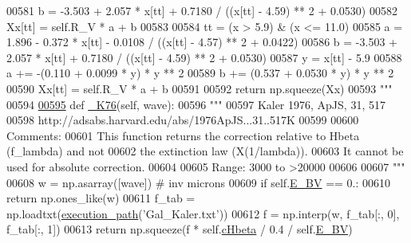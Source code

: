 \begin{DoxyCode}
00581 \textcolor{stringliteral}{        b = -3.503 + 2.057 * x[tt] + 0.7180 / ((x[tt] - 4.59) ** 2 + 0.0530)}
00582 \textcolor{stringliteral}{        Xx[tt] = self.R\_V * a + b}
00583 \textcolor{stringliteral}{}
00584 \textcolor{stringliteral}{        tt = (x > 5.9) & (x <= 11.0)}
00585 \textcolor{stringliteral}{        a = 1.896 - 0.372 * x[tt] - 0.0108 / ((x[tt] - 4.57) ** 2 + 0.0422)}
00586 \textcolor{stringliteral}{        b = -3.503 + 2.057 * x[tt] + 0.7180 / ((x[tt] - 4.59) ** 2 + 0.0530)}
00587 \textcolor{stringliteral}{        y = x[tt] - 5.9}
00588 \textcolor{stringliteral}{        a += -(0.110 + 0.0099 * y) * y ** 2}
00589 \textcolor{stringliteral}{        b += (0.537 + 0.0530 * y) * y ** 2}
00590 \textcolor{stringliteral}{        Xx[tt] = self.R\_V * a + b}
00591 \textcolor{stringliteral}{}
00592 \textcolor{stringliteral}{        return np.squeeze(Xx)}
00593 \textcolor{stringliteral}{        """}
00594 
\hypertarget{red__corr_8py_source_l00595}{}\hyperlink{classpyneb_1_1extinction_1_1red__corr_1_1_red_corr_ac1de28238af5c2fc9924c8cda6386b2a}{00595}     \textcolor{keyword}{def }\hyperlink{classpyneb_1_1extinction_1_1red__corr_1_1_red_corr_ac1de28238af5c2fc9924c8cda6386b2a}{\_K76}(self, wave):
00596         \textcolor{stringliteral}{"""}
00597 \textcolor{stringliteral}{        Kaler 1976, ApJS, 31, 517}
00598 \textcolor{stringliteral}{        http://adsabs.harvard.edu/abs/1976ApJS...31..517K}
00599 \textcolor{stringliteral}{        }
00600 \textcolor{stringliteral}{        Comments:}
00601 \textcolor{stringliteral}{        This function returns the correction relative to Hbeta (f\_lambda) and not}
00602 \textcolor{stringliteral}{        the extinction law (X(1/lambda)).}
00603 \textcolor{stringliteral}{        It cannot be used for absolute correction.}
00604 \textcolor{stringliteral}{        }
00605 \textcolor{stringliteral}{        Range: 3000 to >20000}
00606 \textcolor{stringliteral}{        }
00607 \textcolor{stringliteral}{        """}
00608         w = np.asarray([wave]) \textcolor{comment}{# inv microns}
00609         \textcolor{keywordflow}{if} self.\hyperlink{classpyneb_1_1extinction_1_1red__corr_1_1_red_corr_a0bc581bcaa8eeeb67b83ffdec58bf164}{E\_BV} == 0.:
00610             \textcolor{keywordflow}{return} np.ones\_like(w)
00611         f\_tab = np.loadtxt(\hyperlink{namespacepyneb_1_1utils_1_1misc_a0e9572755930aabb03c6b0e5d66b8356}{execution\_path}(\textcolor{stringliteral}{'Gal\_Kaler.txt'}))
00612         f = np.interp(w, f\_tab[:, 0], f\_tab[:, 1])
00613         \textcolor{keywordflow}{return} np.squeeze(f * self.\hyperlink{classpyneb_1_1extinction_1_1red__corr_1_1_red_corr_aaf16ae2a0bdb5dd620f9db382ffeebc9}{cHbeta} / 0.4 / self.\hyperlink{classpyneb_1_1extinction_1_1red__corr_1_1_red_corr_a0bc581bcaa8eeeb67b83ffdec58bf164}{E\_BV})

\end{DoxyCode}
